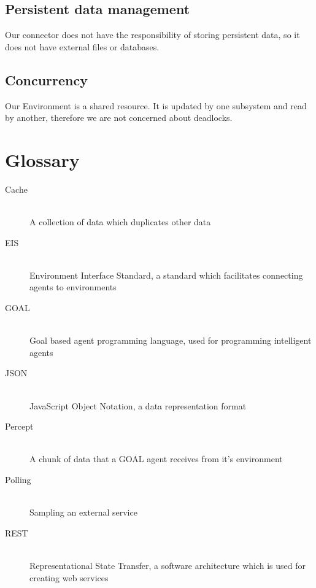 \documentclass[a4paper]{article}
\begin{document}
\subsection{Persistent data management}
Our connector does not have the responsibility of storing persistent data, so it does not have external files or databases.

\subsection{Concurrency}
Our Environment is a shared resource. It is updated by one subsystem and read by another, therefore we are not concerned about deadlocks.

\clearpage
\section{Glossary}
\begin{description}
\item[Cache] \hfill \\
A collection of data which duplicates other data
\item[EIS] \hfill \\
Environment Interface Standard, a standard which facilitates connecting agents to environments
\item[GOAL] \hfill \\
Goal based agent programming language, used for programming intelligent agents
\item[JSON] \hfill \\
JavaScript Object Notation, a data representation format
\item[Percept] \hfill \\
A chunk of data that a GOAL agent receives from it’s environment
\item[Polling] \hfill \\
Sampling an external service
\item[REST] \hfill \\
Representational State Transfer, a software architecture which is used for creating web services
\end{description}
\end{document}
